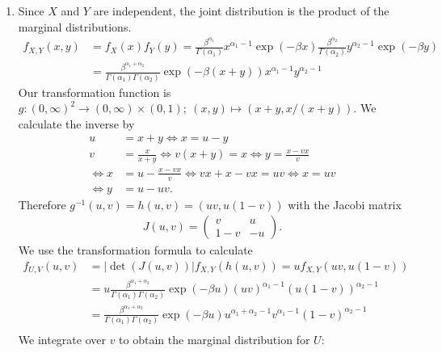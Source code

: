 \begin{solution}

\phantom{}

\begin{enumerate}[label = (\alph*)]
    \item
    Since $X$ and $Y$ are independent, the joint distribution is the product of
    the marginal distributions.
    \begin{align*}
      f_{X,Y}(x,y) &= f_X(x)f_Y(y) = \frac{\beta^{\alpha_1}}{\Gamma(\alpha_1)}x^{\alpha_1 - 1}\exp(-\beta x)
      \frac{\beta^{\alpha_2}}{\Gamma(\alpha_2)}y^{\alpha_2 - 1}\exp(-\beta y) \\
      &= \frac{\beta^{\alpha_1 + \alpha_2}}{\Gamma(\alpha_1)\Gamma(\alpha_2)}\exp(-\beta (x+y))x^{\alpha_1 - 1}y^{\alpha_2 - 1}
    \end{align*}
    Our transformation function is $g: (0,\infty)^2 \to (0,\infty)\times (0,1); \ (x,y) \mapsto (x+y, x/(x+y))$.
    We calculate the inverse by
    \begin{align*}
      u &= x + y \iff x = u - y \\
      v &= \frac{x}{x+y} \iff v(x + y) = x \iff y = \frac{x - vx}{v} \\
      \iff x &= u - \frac{x - vx}{v} \iff vx + x -vx = uv \iff x = uv \\
      \iff y &= u - uv.
    \end{align*}
    Therefore $g^{-1}(u,v) = h(u,v) = (uv, u(1-v))$ with the Jacobi matrix
    \begin{align*}
      J(u,v) = \begin{pmatrix}
        v & u \\ 1 -v & -u
      \end{pmatrix}.
    \end{align*}
    We use the transformation formula to calculate
    \begin{align*}
      f_{U,V}(u,v) &= |\det(J(u,v))|f_{X,Y}(h(u,v))
      = uf_{X,Y}(uv, u(1-v)) \\
      &= u\frac{\beta^{\alpha_1 + \alpha_2}}{\Gamma(\alpha_1)\Gamma(\alpha_2)}
      \exp(-\beta u)(uv)^{\alpha_1 - 1}(u(1-v))^{\alpha_2 - 1} \\
      &= \frac{\beta^{\alpha_1 + \alpha_2}}{\Gamma(\alpha_1)\Gamma(\alpha_2)}
      \exp(-\beta u)u^{\alpha_1 + \alpha_2 - 1}v^{\alpha_1 - 1}(1-v)^{\alpha_2 - 1} \\
    \end{align*}
    We integrate over $v$ to obtain the marginal distribution for $U$:
    \begin{align*}

\end{align*}
\end{enumerate}
\end{solution}

